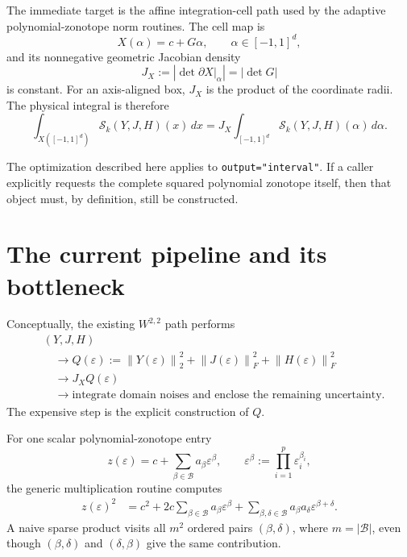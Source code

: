 \documentclass[11pt]{article}
\newcommand{\abs}[1]{\left\lvert #1\right\rvert}
\newcommand{\norm}[1]{\left\lVert #1\right\rVert}
\newcommand{\eps}{\varepsilon}
\begin{document}
The immediate target is the affine integration-cell path used by the adaptive
polynomial-zonotope norm routines.  The cell map is
\[
    X(\alpha)=c+G\alpha,\qquad
    \alpha\in[-1,1]^d,
\]
and its nonnegative geometric Jacobian density
\[
    J_X:=\abs{\det\left.\partial X\right|_\alpha}
        =\abs{\det G}
\]
is constant.  For an axis-aligned box, \(J_X\) is the product of the
coordinate radii.  The physical integral is therefore
\begin{equation}
    \int_{X([-1,1]^d)}
    \mathcal{S}_{k}(Y,J,H)(x)\,dx
    =
    J_X
    \int_{[-1,1]^d}
    \mathcal{S}_{k}(Y,J,H)(\alpha)\,d\alpha.
    \label{eq:physical-integral}
\end{equation}

The optimization described here applies to \texttt{output="interval"}.  If a
caller explicitly requests the complete squared polynomial zonotope itself,
then that object must, by definition, still be constructed.

\section{The current pipeline and its bottleneck}

Conceptually, the existing \(W^{2,2}\) path performs
\begin{equation}
\boxed{
\begin{aligned}
    &(Y,J,H)
    \\
    &\quad\longrightarrow
    Q(\eps)
    :=
    \norm{Y(\eps)}_2^2
    +\norm{J(\eps)}_F^2
    +\norm{H(\eps)}_F^2
    \\
    &\quad\longrightarrow
    J_X Q(\eps)
    \\
    &\quad\longrightarrow
    \text{integrate domain noises and enclose the remaining uncertainty}.
\end{aligned}
}
\label{eq:old-pipeline}
\end{equation}
The expensive step is the explicit construction of \(Q\).

For one scalar polynomial-zonotope entry
\[
    z(\eps)=c+\sum_{\beta\in\mathcal{B}}a_\beta\eps^\beta,
    \qquad
    \eps^\beta:=\prod_{i=1}^{p}\eps_i^{\beta_i},
\]
the generic multiplication routine computes
\begin{align}
    z(\eps)^2
    &=
    c^2
    +2c\sum_{\beta\in\mathcal{B}}a_\beta\eps^\beta
    +\sum_{\beta,\delta\in\mathcal{B}}
        a_\beta a_\delta\eps^{\beta+\delta}.
    \label{eq:scalar-square}
\end{align}
A naive sparse product visits all \(m^2\) ordered pairs
\((\beta,\delta)\), where \(m=\abs{\mathcal{B}}\), even though
\((\beta,\delta)\) and \((\delta,\beta)\) give the same contribution.
\end{document}
